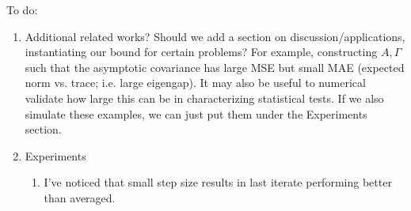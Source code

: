 To do:
\begin{enumerate}
    
    \item Additional related works? 
    Should we add a section on discussion/applications, instantiating our bound for certain problems? 
    For example, constructing $A, \Gamma$ such that the asymptotic covariance has large MSE but small MAE (expected norm vs. trace; i.e. large eigengap).
    It may also be useful to numerical validate how large this can be in characterizing statistical tests. 
    If we also simulate these examples, we can just put them under the Experiments section. 

    


    \item 
    Experiments
    \begin{enumerate}
        \item I've noticed that small step size results in last iterate performing better than averaged. 


\end{enumerate}
\end{enumerate}
